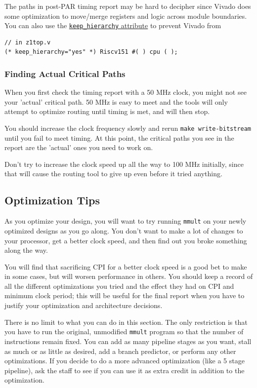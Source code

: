 \documentclass[11pt]{article}
\begin{document}
The paths in post-PAR timing report may be hard to decipher since Vivado does some optimization to move/merge registers and logic across module boundaries.
You can also use the \href{https://www.xilinx.com/support/answers/54778.html}{\texttt{keep\_hierarchy} attribute} to prevent Vivado from 

\begin{verbatim}
// in z1top.v
(* keep_hierarchy="yes" *) Riscv151 #( ) cpu ( );
\end{verbatim}

\subsubsection{Finding Actual Critical Paths}
When you first check the timing report with a 50 MHz clock, you might not see your 'actual' critical path.
50 MHz is easy to meet and the tools will only attempt to optimize routing until timing is met, and will then stop.

You should increase the clock frequency slowly and rerun \verb|make write-bitstream| until you fail to meet timing.
At this point, the critical paths you see in the report are the 'actual' ones you need to work on.

Don't try to increase the clock speed up all the way to 100 MHz initially, since that will cause the routing tool to give up even before it tried anything.

\subsection{Optimization Tips}
As you optimize your design, you will want to try running \verb|mmult| on your newly optimized designs as you go along. You don't want to make a lot of changes to your processor, get a better clock speed, and then find out you broke something along the way.

You will find that sacrificing CPI for a better clock speed is a good bet to make in some cases, but will worsen performance in others.
You should keep a record of all the different optimizations you tried and the effect they had on CPI and minimum clock period; this will be useful for the final report when you have to justify your optimization and architecture decisions.

There is no limit to what you can do in this section.
The only restriction is that you have to run the original, unmodified \verb|mmult| program so that the number of instructions remain fixed.
You can add as many pipeline stages as you want, stall as much or as little as desired, add a branch predictor, or perform any other optimizations.
If you decide to do a more advanced optimization (like a 5 stage pipeline), ask the staff to see if you can use it as extra credit in addition to the optimization.
\end{document}
